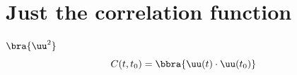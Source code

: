 \documentclass[twocolumn]{article}
\begin{document}
\section{Just the correlation function}

$\bra{\uu^2}$
\begin{equation}
C(t,t_0)=\bbra{\uu(t)\cdot\uu(t_0)}
\end{equation}





\end{document}
